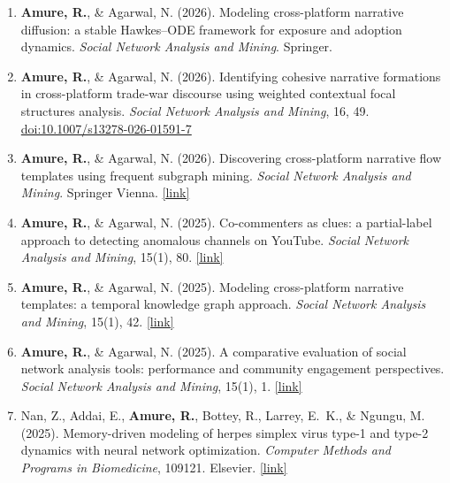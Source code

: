 \documentclass[11pt, letterpaper]{article}
\newcommand{\pubentry}[1]{%
  \item #1
}
\begin{document}
\begin{enumerate}[leftmargin=1.5em, itemsep=5pt, topsep=4pt]

  \pubentry{%
    \textbf{Amure, R.}, \& Agarwal, N. (2026).
    Modeling cross-platform narrative diffusion: a stable Hawkes--ODE framework for exposure and adoption dynamics.
    \textit{Social Network Analysis and Mining}. Springer.
  }

  \pubentry{%
    \textbf{Amure, R.}, \& Agarwal, N. (2026).
    Identifying cohesive narrative formations in cross-platform trade-war discourse using weighted contextual focal structures analysis.
    \textit{Social Network Analysis and Mining}, 16, 49.
    \href{https://doi.org/10.1007/s13278-026-01591-7}{doi:10.1007/s13278-026-01591-7}
  }

  \pubentry{%
    \textbf{Amure, R.}, \& Agarwal, N. (2026).
    Discovering cross-platform narrative flow templates using frequent subgraph mining.
    \textit{Social Network Analysis and Mining}. Springer Vienna.
    \href{https://link.springer.com/content/pdf/10.1007/s13278-025-01577-x_reference.pdf}{[link]}
  }

  \pubentry{%
    \textbf{Amure, R.}, \& Agarwal, N. (2025).
    Co-commenters as clues: a partial-label approach to detecting anomalous channels on YouTube.
    \textit{Social Network Analysis and Mining}, 15(1), 80.
    \href{https://link.springer.com/article/10.1007/s13278-025-01493-0}{[link]}
  }

  \pubentry{%
    \textbf{Amure, R.}, \& Agarwal, N. (2025).
    Modeling cross-platform narrative templates: a temporal knowledge graph approach.
    \textit{Social Network Analysis and Mining}, 15(1), 42.
    \href{https://link.springer.com/article/10.1007/s13278-025-01429-8}{[link]}
  }

  \pubentry{%
    \textbf{Amure, R.}, \& Agarwal, N. (2025).
    A comparative evaluation of social network analysis tools: performance and community engagement perspectives.
    \textit{Social Network Analysis and Mining}, 15(1), 1.
    \href{https://link.springer.com/article/10.1007/s13278-025-01409-y}{[link]}
  }

  \pubentry{%
    Nan, Z., Addai, E., \textbf{Amure, R.}, Bottey, R., Larrey, E.~K., \& Ngungu, M. (2025).
    Memory-driven modeling of herpes simplex virus type-1 and type-2 dynamics with neural network optimization.
    \textit{Computer Methods and Programs in Biomedicine}, 109121. Elsevier.
    \href{https://www.sciencedirect.com/science/article/pii/S0169260725005371}{[link]}
  }


\end{enumerate}
\end{document}
